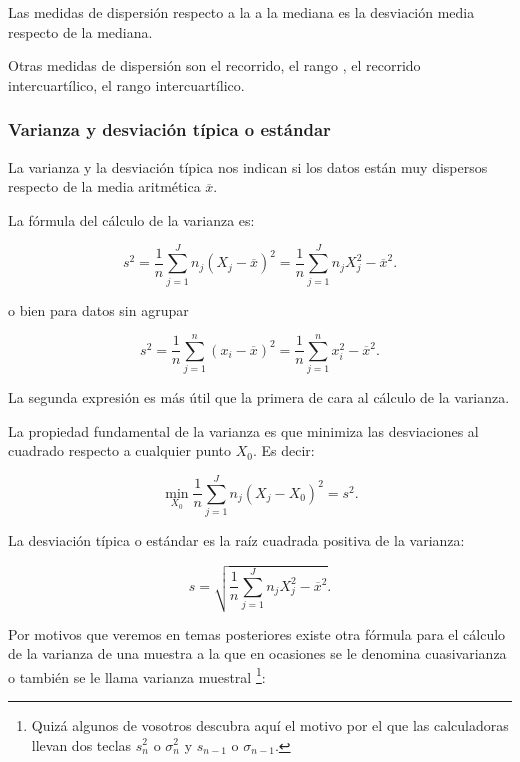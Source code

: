 \documentclass[12pt]{report}
\begin{document}
Las medidas de dispersión respecto a la a la mediana es la desviación media respecto de
la mediana.

Otras medidas de dispersión son el recorrido, el rango , el recorrido intercuartílico, el
rango intercuartílico.



\subsubsection{Varianza y  desviación típica o estándar}

La varianza y la desviación  típica nos indican si los datos  están muy dispersos
respecto de la media aritmética $\overline{x}$.

La fórmula del cálculo de la varianza es:

$$s^{2}=\frac{1}{n} \sum\limits_{j=1}^{J}
n_j(X_j-\overline{x})^2=\frac{1}{n} \sum\limits_{j=1}^{J} n_j X_j^2- \overline{x}^2.$$

o bien para datos sin agrupar

$$s^{2}=\frac{1}{n} \sum\limits_{j=1}^{n}
(x_i-\overline{x})^2=\frac{1}{n} \sum\limits_{j=1}^{n}  x_i^2- \overline{x}^2.$$

La segunda expresión es más útil que la primera de cara al cálculo de la  varianza.

La propiedad fundamental de la varianza  es que  minimiza las desviaciones  al cuadrado
respecto a cualquier punto $X_0$. Es decir:

$$\min_{X_0} \frac{1}{n} \sum\limits_{j=1}^{J}n_j (X_j - X_0)^2=s^2.$$

La desviación típica o estándar es la raíz cuadrada positiva de la varianza:

$$s=\sqrt{\frac{1}{n} \sum\limits_{j=1}^{J} n_j X_j^2-
\overline{x}^2}.$$

Por motivos que veremos en temas posteriores existe otra fórmula para el cálculo de la
varianza de una muestra a la que en ocasiones se le denomina cuasivarianza o también se le
llama varianza muestral  \footnote{Quizá algunos de vosotros descubra aquí el motivo por el que
las calculadoras llevan dos teclas $s_n^2$ o $\sigma_{n}^2$ y $s_{n-1}$ o
$\sigma_{n-1}$.}:
\end{document}
